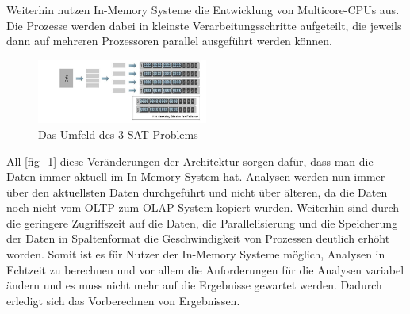 Weiterhin nutzen In-Memory Systeme die Entwicklung von Multicore-CPUs aus. Die Prozesse werden dabei in kleinste Verarbeitungsschritte aufgeteilt, die jeweils dann auf mehreren Prozessoren parallel ausgeführt werden können.\\
\begin{figure}[ht]
  \begin{center}
  \includegraphics[width=0.5\textwidth]{images/data.png}
  \end{center}
  \caption{Das Umfeld des 3-SAT Problems}
  \label{fig_4}
\end{figure} 
All \ref{fig_1} diese Veränderungen der Architektur sorgen dafür, dass man die Daten immer 
aktuell im In-Memory System hat. Analysen werden nun immer über 
den aktuellsten Daten durchgeführt und nicht über älteren, da die Daten noch nicht vom OLTP zum OLAP System kopiert wurden. Weiterhin sind durch die geringere Zugriffszeit auf die Daten, die Parallelisierung und die Speicherung der Daten in Spaltenformat die Geschwindigkeit von Prozessen deutlich erhöht worden. Somit ist es für Nutzer der In-Memory Systeme möglich, Analysen in Echtzeit zu berechnen und vor allem die Anforderungen für die Analysen variabel ändern und es muss nicht mehr auf die Ergebnisse gewartet werden. Dadurch erledigt sich das Vorberechnen von Ergebnissen.
\\
